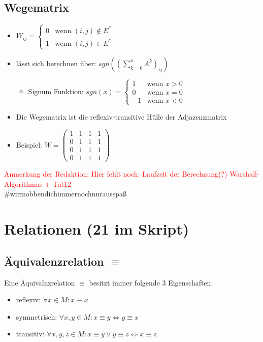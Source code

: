 \documentclass[a4paper,portrait]{scrartcl}
\begin{document}
\subsection{Wegematrix}
\begin{itemize}
\item
$W_{ij} = \begin{cases}
0&\text{wenn } (i,j) \notin E^{*}\\
1&\text{wenn } (i,j) \in E^{*}
\end{cases}$
\item lässt sich berechnen über: $sgn((\sum\limits_{k=0}^{n} A^{k})_{ij})$
  \begin{itemize}
  \item Signum Funktion: $sgn(x) = 
  \begin{cases}
  1 &\text{wenn } x>0 \\
  0 &\text{wenn } x=0 \\
  -1 &\text{wenn } x<0
  \end{cases}$
  \end{itemize}
\item Die Wegematrix ist die reflexiv-transitive Hülle der Adjazenzmatrix
\item Beispiel: 
$ W =
\begin{pmatrix}
1 & 1 & 1 & 1 \\
0 & 1 & 1 & 1 \\
0 & 1 & 1 & 1 \\
0 & 1 & 1 & 1
\end{pmatrix}
$ 
\end{itemize}
\textcolor{red}{Anmerkung der Redaktion: \grqq Hier fehlt noch: Laufzeit der Berechnung(?) Warshall-Algorithmus + Tut12\grqq}\\ \#wirmobbendichimmernochnurausspaß
\section{Relationen (21 im Skript)}
\subsection{Äquivalenzrelation $\equiv$}
Eine Äquivalnzrelation $\equiv$ besitzt immer folgende 3 Eigenschaften:
\begin{itemize}
\item reflexiv: $ \forall x \in M: x \equiv x $
\item symmetrisch: $ \forall x,y \in M: x \equiv y \Leftrightarrow y \equiv x $
\item transitiv: $ \forall x,y,z \in M: x \equiv y \vee y \equiv z \Leftrightarrow x \equiv z $
\end{itemize}
\end{document}
